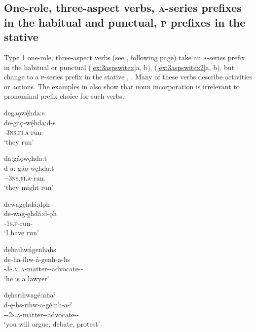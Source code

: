\subsection{One-role, three-aspect verbs, \textsc{a}-series prefixes in the habitual and punctual, \textsc{p} prefixes in the stative} \label{One-role, three-aspect verbs, A prefixes in the habitual and punctual, O prefixes in the stative}
Type 1 one-role, three-aspect verbs (see , following page) take an \textsc{a}-series prefix in the habitual or punctual (\ref{ex:3aspswitex}a, b), (\ref{ex:3aspswitex2}a, b), but change to a \textsc{p}-series prefix in the stative , . Many of these verbs describe activities or actions. The examples in  also show that noun incorporation is irrelevant to pronominal prefix choice for such verbs.

\ea\label{ex:3aspswitex} {} 
\ea degaǫwę́hda:s\\\label{ex:3aspswitexa}
\gll de-gaǫ-wę́hda:d-s\\
 {\dualic}-\textsc{3ns.fi.a}-run-{\habitual}\\
\glt `they run'

\ex da:gáǫwę̱hda:t\\\label{ex:3aspswitexb}
\gll d-a:-gáǫ-wę̱hda:t\\
 {\dualic}-{\indefinite}-\textsc{3ns.fi.a}-run.{\zeropunctual}\\
\glt `they might run'

\ex dewagę̱hdá:dǫh\\\label{ex:3aspswitexc}
\gll de-wag-ę̱hdá:d-ǫh\\
 {\dualic}-\textsc{1s.p}-run-{\stative}\\
\glt `I have run'
\z
\z

\ea\label{ex:3aspswitex2} {} 
\ea de̱haihwágenhahs\\\label{ex:3aspswitex2a}
\gll de̱-ha-ihw-á-genh-a-hs\\
 {\dualic}-\textsc{3s.m.a}-matter-{\joinerA}-advocate-{\joinerA}-{\habitual}\\
\glt `he is a lawyer'

\ex dęhsrihwagé:nhaˀ\\\label{ex:3aspswitex2b}
\gll d-ę-hs-rihw-a-gé:nh-a-ˀ\\
 {\dualic}-{\future}-\textsc{2s.a}-matter-{\joinerA}-advocate-{\joinerA}-{\punctual}\\
\glt `you will argue, debate, protest'

